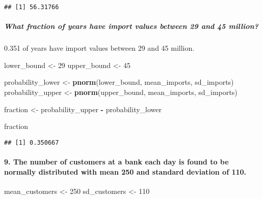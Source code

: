 \documentclass[
]{article}
\newenvironment{Shaded}{\begin{snugshade}}{\end{snugshade}}
\newcommand{\DecValTok}[1]{\textcolor[rgb]{0.00,0.00,0.81}{#1}}
\newcommand{\FunctionTok}[1]{\textcolor[rgb]{0.13,0.29,0.53}{\textbf{#1}}}
\newcommand{\NormalTok}[1]{#1}
\newcommand{\OtherTok}[1]{\textcolor[rgb]{0.56,0.35,0.01}{#1}}
\newcommand{\SpecialCharTok}[1]{\textcolor[rgb]{0.81,0.36,0.00}{\textbf{#1}}}
\begin{document}
\begin{verbatim}
## [1] 56.31766
\end{verbatim}

\hypertarget{what-fraction-of-years-have-import-values-between-29-and-45-million}{%
\subparagraph{What fraction of years have import values between 29 and
45
million?}\label{what-fraction-of-years-have-import-values-between-29-and-45-million}}

0.351 of years have import values between 29 and 45 million.

\begin{Shaded}
\begin{Highlighting}[]
\NormalTok{lower\_bound }\OtherTok{\textless{}{-}} \DecValTok{29}
\NormalTok{upper\_bound }\OtherTok{\textless{}{-}} \DecValTok{45}

\NormalTok{probability\_lower }\OtherTok{\textless{}{-}} \FunctionTok{pnorm}\NormalTok{(lower\_bound, mean\_imports, sd\_imports)}
\NormalTok{probability\_upper }\OtherTok{\textless{}{-}} \FunctionTok{pnorm}\NormalTok{(upper\_bound, mean\_imports, sd\_imports)}

\NormalTok{fraction }\OtherTok{\textless{}{-}}\NormalTok{ probability\_upper }\SpecialCharTok{{-}}\NormalTok{ probability\_lower}

\NormalTok{fraction}
\end{Highlighting}
\end{Shaded}

\begin{verbatim}
## [1] 0.350667
\end{verbatim}

\hypertarget{the-number-of-customers-at-a-bank-each-day-is-found-to-be-normally-distributed-with-mean-250-and-standard-deviation-of-110.}{%
\paragraph{9. The number of customers at a bank each day is found to be
normally distributed with mean 250 and standard deviation of
110.}\label{the-number-of-customers-at-a-bank-each-day-is-found-to-be-normally-distributed-with-mean-250-and-standard-deviation-of-110.}}

\begin{Shaded}
\begin{Highlighting}[]
\NormalTok{mean\_customers }\OtherTok{\textless{}{-}} \DecValTok{250}
\NormalTok{sd\_customers }\OtherTok{\textless{}{-}} \DecValTok{110}
\end{Highlighting}
\end{Shaded}
\end{document}

